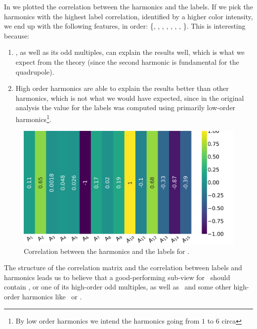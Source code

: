 In  we plotted the correlation between the harmonics and the labels. If we pick
the harmonics with the highest label correlation, identified by a higher color intensity, we end up
with the following features, in order: \{\an[2], \an[6], \an[10], \an[11], \an[12], \an[13], \an[14],
\an[15]\}. This is interesting because:
\begin{enumerate}
	\item \an[2], as well as its odd multiples, can explain the results well, which is what we
	      expect from the theory (since the second harmonic is fundamental for the quadrupole).
	\item High order harmonics are able to explain the results better than other harmonics,
	      which is not what we would have expected, since in the original analysis the value for the
	      labels was computed using primarily low-order harmonics\footnote{
		      By low order harmonics we intend the harmonics going from $1$ to $6$ circa
	      }.
\end{enumerate}

\begin{figure}[!ht]
	\centering
	\includegraphics[width=0.7\linewidth]{img/An_label_corr.png}
	\caption{Correlation between the harmonics and the labels for \an.} \label{fig:an-lcorr}
\end{figure}

The structure of the correlation matrix and the correlation between labels and harmonics leads us to
believe that a good-performing sub-view for \an\ should contain \an[2], or one of its high-order
odd multiples, as well as \an[15]\ and some other high-order harmonics like \an[11]\ or \an[13].

